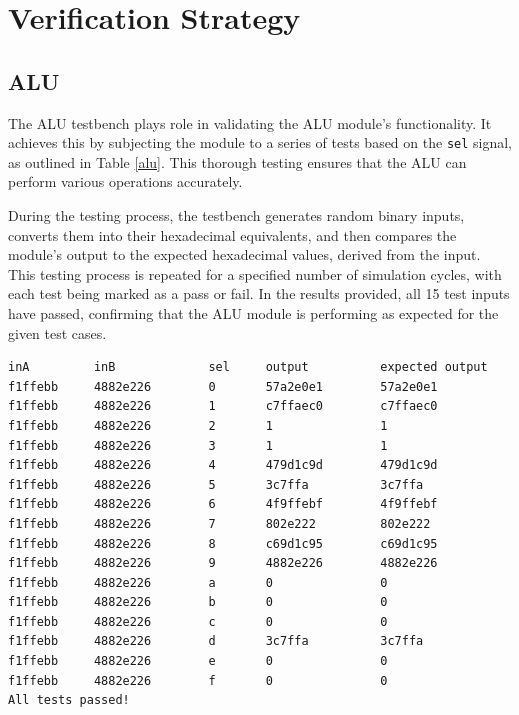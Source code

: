 \documentclass[12pt,a4paper,oneside]{book} %
\begin{document}
\chapter{Verification Strategy}
\section{ALU}
The ALU testbench plays role in validating the ALU module's functionality. It achieves this by subjecting the module to a series of tests based on the \texttt{sel} signal, as outlined in Table \ref{alu}. This thorough testing ensures that the ALU can perform various operations accurately.

During the testing process, the testbench generates random binary inputs, converts them into their hexadecimal equivalents, and then compares the module's output to the expected hexadecimal values, derived from the input. This testing process is repeated for a specified number of simulation cycles, with each test being marked as a pass or fail. In the results provided, all 15 test inputs have passed, confirming that the ALU module is performing as expected for the given test cases.
\begin{verbatim}
inA         inB             sel     output          expected output
f1ffebb     4882e226        0       57a2e0e1        57a2e0e1
f1ffebb     4882e226        1       c7ffaec0        c7ffaec0
f1ffebb     4882e226        2       1               1
f1ffebb     4882e226        3       1               1
f1ffebb     4882e226        4       479d1c9d        479d1c9d
f1ffebb     4882e226        5       3c7ffa          3c7ffa
f1ffebb     4882e226        6       4f9ffebf        4f9ffebf
f1ffebb     4882e226        7       802e222         802e222
f1ffebb     4882e226        8       c69d1c95        c69d1c95
f1ffebb     4882e226        9       4882e226        4882e226
f1ffebb     4882e226        a       0               0
f1ffebb     4882e226        b       0               0
f1ffebb     4882e226        c       0               0
f1ffebb     4882e226        d       3c7ffa          3c7ffa
f1ffebb     4882e226        e       0               0
f1ffebb     4882e226        f       0               0
All tests passed!
\end{verbatim}
\end{document}
